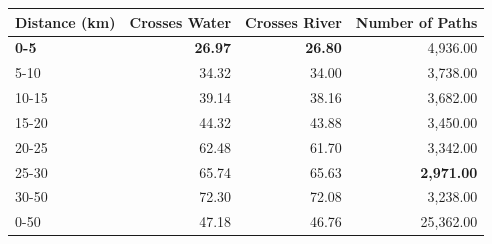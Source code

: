\begin{tabular}{lrrr}
\toprule
Distance (km) & Crosses Water & Crosses River & Number of Paths \\
\midrule
\textbf{0-5} & \textbf{26.97} & \textbf{26.80} & 4,936.00 \\
5-10 & 34.32 & 34.00 & 3,738.00 \\
10-15 & 39.14 & 38.16 & 3,682.00 \\
15-20 & 44.32 & 43.88 & 3,450.00 \\
20-25 & 62.48 & 61.70 & 3,342.00 \\
25-30 & 65.74 & 65.63 & \textbf{2,971.00} \\
30-50 & 72.30 & 72.08 & 3,238.00 \\
0-50 & 47.18 & 46.76 & 25,362.00 \\
\bottomrule
\end{tabular}
